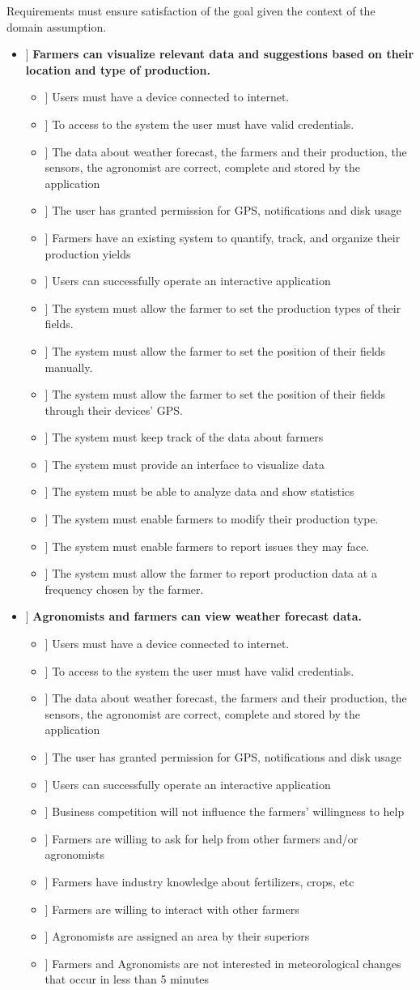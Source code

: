 \newcommand\goal[1]{\item[[ G#1]]}
\newcommand\dom[1]{\item[[ D#1]]}
\newcommand\req[1]{\item[[ R#1]]}

Requirements must ensure satisfaction of the goal given the context of the domain assumption.


\begin{itemize}
\goal{1} \textbf{Farmers can visualize relevant data and suggestions based on their location and type of production.}

\begin{itemize}
\dom{1}  Users must have a device connected to internet.
\dom{2} To access to the system the user must have valid credentials.
\dom{3} The data about weather forecast, the farmers and their production, the sensors, the agronomist are correct, complete and stored by the application
\dom{4} The user has granted permission for GPS, notifications and disk usage
\dom{5} Farmers have an existing system to quantify, track, and organize their production yields
\dom{6} Users can successfully operate an interactive application

\req{1} The system must allow the farmer to set the production types of their fields.
\req{2} The system must allow the farmer to set the position of their fields manually.
\req{3} The system must allow the farmer to set the position of their fields through their devices' GPS.
\req{4} The system must keep track of the data about farmers
\req{5} The system must provide an interface to visualize data
\req{6} The system must be able to analyze data and show statistics
\req{7} The system must enable farmers to modify their production type.
\req{8} The system must enable farmers to report issues they may face.
\req{9} The system must allow the farmer to report production data at a frequency chosen by the farmer.
\end{itemize}

\goal{2}  \textbf{Agronomists and farmers can view weather forecast data.}

\begin{itemize}
\dom{1}  Users must have a device connected to internet.
\dom{2} To access to the system the user must have valid credentials.
\dom{3} The data about weather forecast, the farmers and their production, the sensors, the agronomist are correct, complete and stored by the application
\dom{4} The user has granted permission for GPS, notifications and disk usage
\dom{6} Users can successfully operate an interactive application
\dom{7} Business competition will not influence the farmers' willingness to help
\dom{8} Farmers are willing to ask for help from other farmers and/or agronomists
\dom{9} Farmers have industry knowledge about fertilizers, crops, etc 
\dom{10} Farmers are willing to interact with other farmers 
\dom{12} Agronomists are assigned an area by their superiors
\dom{16} Farmers and Agronomists are not interested in meteorological changes that occur in less than 5 minutes


\end{itemize}
\end{itemize}
